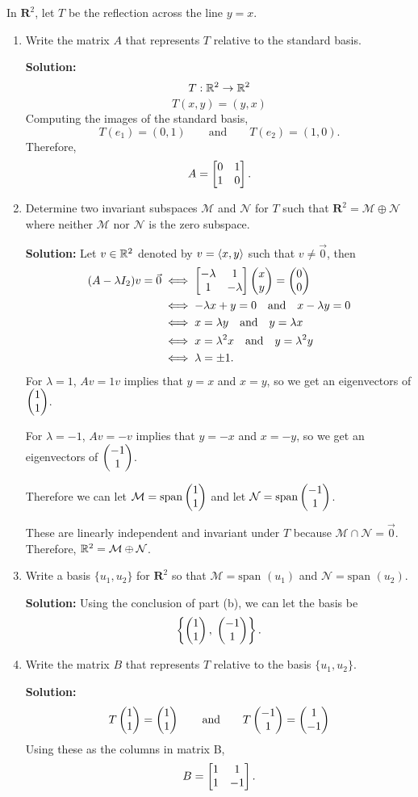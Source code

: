 In $\mathbf{R}^2$, let $T$ be the reflection across the line $y=x$.
\begin{enumerate}
\item Write the matrix $A$ that represents $T$ relative to the standard basis.
\begin{mybox}
        \textbf{Solution:}
        $$T : \mathbb{R}^2 \to \mathbb{R}^2$$
        $$T(x,y) = (y,x)$$
        Computing the images of the standard basis,
        $$T(e_1) = (0,1) \qquad\text{and}\qquad T(e_2) = (1,0).$$
        Therefore,
        $$A = \begin{bmatrix}{0} & {1}\\{1}&{0}\end{bmatrix}.$$
\end{mybox}

\newpage
\item Determine two invariant subspaces $\mathcal{M}$ and $\mathcal{N}$ for $T$ such that $\mathbf{R}^2 = \mathcal{M} \oplus \mathcal{N}$ where neither $\mathcal{M}$ nor $\mathcal{N}$ is the zero subspace.
\begin{mybox}
\textbf{Solution: } Let $v \in \mathbb{R}^2$ denoted by $v = \left\langle{x,y}\right\rangle$ such that $v \neq \vec{0}$, then
\begin{align*}
        (A-\lambda I_2)v = \vec{0} &\iff \begin{bmatrix}{-\lambda} & {1}\\{1}&{-\lambda}\end{bmatrix} \begin{pmatrix}{x}\\{y}\end{pmatrix} = \begin{pmatrix}{0}\\{0}\end{pmatrix}\\
        &\iff -\lambda x + y = 0 \quad \text{and} \quad x - \lambda y = 0\\
        & \iff x = \lambda y  \quad \text{and} \quad  y = \lambda x\\
        & \iff x = \lambda^2 x  \quad \text{and} \quad y = \lambda^2 y\\
        & \iff \lambda = \pm 1.
\end{align*}
For $\lambda = 1$, $Av = 1v$ implies that $y=x$ and $x=y$, so we get an eigenvectors of $\begin{pmatrix}{1}\\{1}\end{pmatrix}$.

\nl For $\lambda = -1$, $Av = -v$ implies that $y=-x$ and $x=-y$, so we get an eigenvectors of $\begin{pmatrix}{-1}\\{1}\end{pmatrix}$.

\nl Therefore we can let $\mathcal{M} = \operatorname{span}\begin{pmatrix}{1}\\{1}\end{pmatrix}$ and let $\mathcal{N} = \operatorname{span}\begin{pmatrix}{-1}\\{1}\end{pmatrix}$.

\nl These are linearly independent and invariant under $T$ because $\mathcal{M} \cap \mathcal{N} = \vec{0}$. Therefore, $\mathbb{R}^2 = \mathcal{M} \oplus \mathcal{N}$.
\end{mybox}

\item Write a basis $\{ u_1, u_2 \}$ for $\mathbf{R}^2$ so that $\mathcal{M} = \text{span } (u_1)$ and  $\mathcal{N} = \text{span } (u_2)$.
\begin{mybox}
       \textbf{Solution:} Using the conclusion of part (b), we can let the basis be $$\left\{\begin{pmatrix}{1}\\{1}\end{pmatrix}, \; \begin{pmatrix}{-1}\\{1}\end{pmatrix}  \right\}.$$
\end{mybox}

\item Write the matrix $B$ that represents $T$ relative to the basis $\{ u_1, u_2 \}$.
\begin{mybox}
        \textbf{Solution: } 
        $$T\begin{pmatrix}{1}\\{1}\end{pmatrix} = \begin{pmatrix}{1}\\{1}\end{pmatrix} \qquad \text{and} \qquad T\begin{pmatrix}{-1}\\{1}\end{pmatrix} = \begin{pmatrix}{1}\\{-1}\end{pmatrix}$$
        Using these as the columns in matrix B,
        $$B = \begin{bmatrix}{1} & {1}\\{1}&{-1}\end{bmatrix}.$$
\end{mybox}
\end{enumerate}